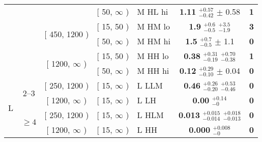 \begin{table}[htbp]
\begin{tabular}{cccclcc}
& & & [ 50, $\infty$ ) & M HL hi & \textbf{1.11} $^{+0.57}_{-0.42}$ $\pm$ 0.58  & \textbf{1}\\ %

& & \multirow{2}{*}{[ 450, 1200 )} & [ 15, 50 ) & M HM lo & \textbf{1.9} $^{+0.6}_{-0.5}$ $^{+3.5}_{-1.9}$  & \textbf{3}\\ %

& & & [ 50, $\infty$ ) & M HM hi & \textbf{1.5} $^{+0.7}_{-0.5}$ $\pm$ 1.1  & \textbf{0}\\ %

& & \multirow{2}{*}{[ 1200, $\infty$ )} & [ 15, 50 ) & M HH lo & \textbf{0.38} $^{+0.31}_{-0.19}$ $^{+0.70}_{-0.38}$  & \textbf{1}\\ %

& & & [ 50, $\infty$ ) & M HH hi & \textbf{0.12} $^{+0.29}_{-0.10}$ $\pm$ 0.04  & \textbf{0}\\ %

\hline

\hline

\multirow{4}{*}{L} 

& \multirow{2}{*}{2--3} & [ 250, 1200 ) & [ 15, $\infty$ ) & L LLM  & \textbf{0.46} $^{+0.26}_{-0.20}$ $^{+0.53}_{-0.46}$  & \textbf{0}\\ %

&  & [ 1200, $\infty$ ) & [ 15, $\infty$ ) & L LH  & \textbf{0.00} $^{+0.14}_{-0}$  & \textbf{0}\\ %

& \multirow{2}{*}{$\geq 4$} & [ 250, 1200 ) & [ 15, $\infty$ ) & L HLM  & \textbf{0.013} $^{+0.015}_{-0.014}$ $^{+0.018}_{-0.013}$  & \textbf{0}\\ %

&  & [ 1200, $\infty$ ) & [ 15, $\infty$ ) & L HH  & \textbf{0.000} $^{+0.008}_{-0}$ & \textbf{0}\\ %

\hline

\end{tabular}

\end{table}


\endgroup
